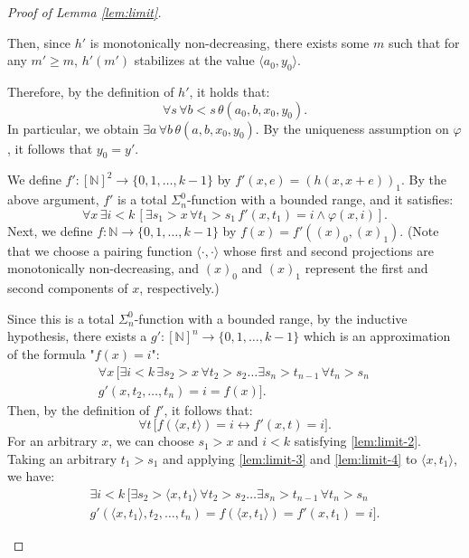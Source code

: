 \documentclass[10pt,reqno]{amsart}
\numberwithin{equation}{section}
\begin{document}
\begin{proof}[Proof of Lemma \ref{lem:limit}]
\begin{enumerate}[label=(\roman*),topsep=0.5em,itemsep=0.5em]
  Then, since $h'$ is monotonically non-decreasing, there exists some $m$ such that for any $m' \ge m$, $h'(m')$ stabilizes at the value $\langle a_0,y_0 \rangle$.


  Therefore, by the definition of $h'$, it holds that:
  \begin{equation}
   \forall s \, \forall b < s \, \theta(a_0,b,x_0,y_0). \label{lem:limit-1}
   \end{equation}
  In particular, we obtain $\exists a \, \forall b \, \theta(a,b,x_0,y_0)$. By the uniqueness assumption on $\varphi$, it follows that $y_0=y'$.


  We define $f'\colon[\mathbb{N}]^2\to\{0,1,\dots,k-1\}$ by $f'(x,e)=(h(x,x+e))_1$. By the above argument, $f'$ is a total $\Sigma_{n}^{0}$-function with a bounded range, and it satisfies:
\begin{equation}
 \forall x \, \exists i < k \, [\exists s_1 > x \, \forall t_1 > s_1 \, f'(x,t_1)=i \land \varphi(x,i)]. \label{lem:limit-2}
 \end{equation}
  Next, we define $f\colon\mathbb{N}\to \{0,1,\dots,k-1\}$ by $f(x)=f'((x)_0,(x)_1)$. (Note that we choose a pairing function $\langle \cdot, \cdot \rangle$ whose first and second projections are monotonically non-decreasing, and $(x)_0$ and $(x)_1$ represent the first and second components of $x$, respectively.)


  Since this is a total $\Sigma_{n}^{0}$-function with a bounded range, by the inductive hypothesis, there exists a $g'\colon[\mathbb{N}]^{n}\to \{0,1,\dots,k-1\}$ which is an approximation of the formula "$f(x)=i$":
  \begin{multline} \forall x \, \big[\exists i < k \, \exists s_2 > x \, \forall t_2 > s_2 \dots \exists s_{n} > t_{n-1} \, \forall t_{n} > s_{n} \, \\
  g'(x,t_2,\dots,t_n)=i=f(x)\big]. \label{lem:limit-3}
  \end{multline}
  Then, by the definition of $f'$, it follows that:
  \begin{equation}
   \forall t \, \big[f(\langle x,t \rangle)=i \leftrightarrow f'(x,t)=i\big]. \label{lem:limit-4}
   \end{equation}
  For an arbitrary $x$, we can choose $s_1>x$ and $i<k$ satisfying \eqref{lem:limit-2}. Taking an arbitrary $t_1 > s_1$ and applying \eqref{lem:limit-3} and \eqref{lem:limit-4} to $\langle x,t_1 \rangle$, we have:
  \begin{multline}
\exists i < k \, \big[\exists s_2 > \langle x,t_1 \rangle \, \forall t_2 > s_2 \dots \exists s_{n} > t_{n-1} \, \forall t_{n} > s_{n}\\
g'(\langle x,t_1 \rangle,t_2,\dots,t_n)=f(\langle x,t_1 \rangle)=f'(x,t_1)=i\big]. \label{lem:limit-5}
  \end{multline}



\end{enumerate}
\end{proof}
\end{document}
